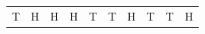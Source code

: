 {{\begin{center}
\begin{xtabular}[t]{|l|l|l|l|l|l|l|l|l|l|}
    
        T &
    
    
        H &
    
    
        H &
    
    
        H &
    
    
        T &
    
    
        T &
    
    
        H &
    
    
        T &
    
    
        T &
    
    
        H%
     \tabularnewline{}
    

\end{xtabular}
\end{center}}}
